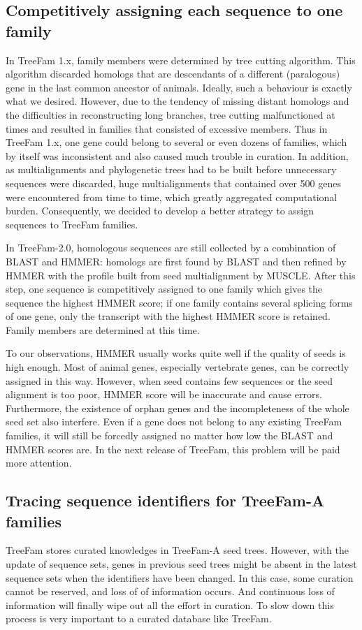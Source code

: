 \subsection{Competitively assigning each sequence to one family}
In TreeFam 1.x, family members were determined by tree cutting algorithm. This algorithm
discarded homologs that are descendants of a different (paralogous) gene in
the last common ancestor of animals. Ideally, such a behaviour is exactly what we desired.
However, due to the tendency of missing distant homologs and the difficulties
in reconstructing long branches, tree cutting malfunctioned at times and resulted
in families that consisted of excessive members. Thus in TreeFam 1.x, one gene
could belong to several or even dozens of families, which by itself was inconsistent and
also caused much trouble in curation. In addition, as multialignments and phylogenetic trees had to be built
before unnecessary sequences were discarded, huge multialignments that contained
over 500 genes were encountered from time to time, which greatly
aggregated computational burden. Consequently, we decided to develop a
better strategy to assign sequences to TreeFam families.

In TreeFam-2.0, homologous sequences are still collected by a combination of BLAST and HMMER:
homologs are first found by BLAST and then refined by HMMER with the profile built from
seed multialignment by MUSCLE. After this step, one sequence
is competitively assigned to one family which gives the
sequence the highest HMMER score; if one family contains several splicing forms of one
gene, only the transcript with the highest HMMER score is retained. Family members
are determined at this time.

To our observations, HMMER usually works quite well if the quality of seeds is
high enough. Most of animal genes, especially vertebrate genes, can be
correctly assigned in this way. However, when seed contains few sequences or
the seed alignment is too poor, HMMER score will be inaccurate and
cause errors. Furthermore, the existence of orphan genes and the
incompleteness of the whole seed set also interfere. Even if a gene does not
belong to any existing TreeFam families, it will still be forcedly assigned
no matter how low the BLAST and HMMER scores are. In the next release of TreeFam,
this problem will be paid more attention.

\subsection{Tracing sequence identifiers for TreeFam-A families}
TreeFam stores curated knowledges in TreeFam-A seed trees. However, with the update
of sequence sets, genes in previous seed trees might be absent in the latest sequence sets when
the identifiers have been changed. In this case, some curation cannot be reserved, and loss of
of information occurs. And continuous loss of information will finally wipe
out all the effort in curation. To slow down this process is very important to a curated
database like TreeFam.

